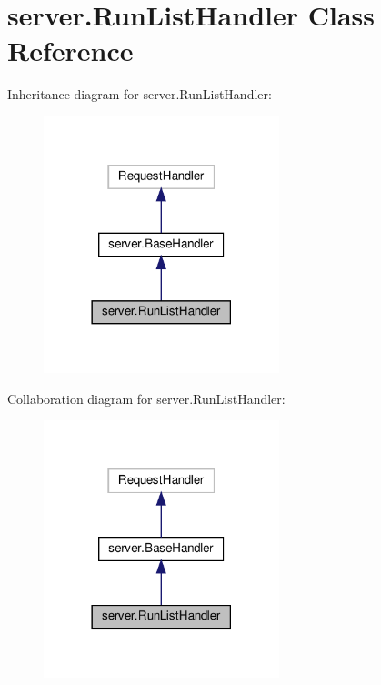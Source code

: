 \hypertarget{classserver_1_1RunListHandler}{}\section{server.\+Run\+List\+Handler Class Reference}
\label{classserver_1_1RunListHandler}


Inheritance diagram for server.\+Run\+List\+Handler\+:
\nopagebreak
\begin{figure}[H]
\begin{center}
\leavevmode
\includegraphics[width=194pt]{classserver_1_1RunListHandler__inherit__graph}
\end{center}
\end{figure}


Collaboration diagram for server.\+Run\+List\+Handler\+:
\nopagebreak
\begin{figure}[H]
\begin{center}
\leavevmode
\includegraphics[width=194pt]{classserver_1_1RunListHandler__coll__graph}
\end{center}
\end{figure}
